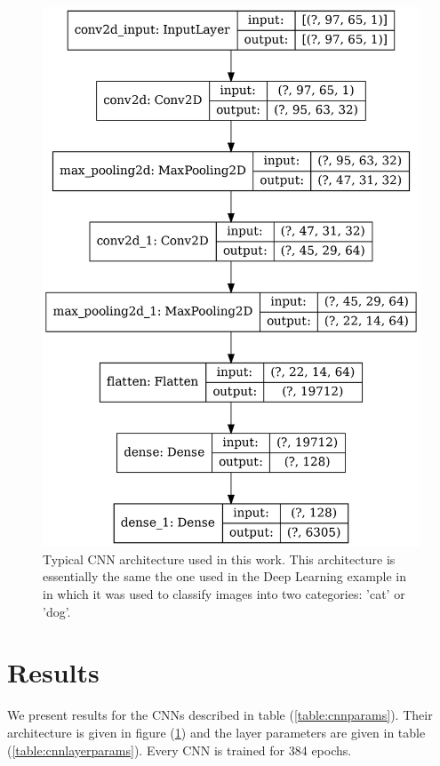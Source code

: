 \documentclass[12pt]{article}
\begin{document}
\begin{figure}[h] 
   \centering
    \includegraphics[totalheight=9cm]{Figures/typical_cnn.png}
    \caption{\label{fig:typical_cnn}Typical CNN architecture used in this work. This architecture is essentially the same the one used in the Deep Learning example in \cite{misc:udemy} in which it was used to classify images into two categories: 'cat' or 'dog'.}
\end{figure}
%
%
\section{Results}
We present results for the CNNs described in table (\ref{table:cnnparams}). Their architecture is given in figure (\ref{fig:typical_cnn}) and the layer parameters are given in table (\ref{table:cnnlayerparams}). Every CNN is trained for 384 epochs.
\end{document}
